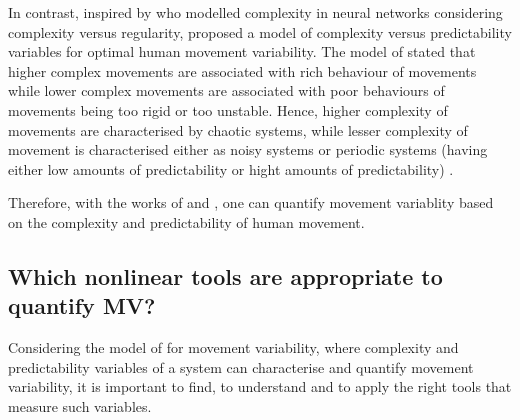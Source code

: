 In contrast, inspired by \cite{tononi1998} who modelled complexity 
in neural networks considering complexity versus regularity,
\cite{stergiou2006} proposed a model of complexity versus predictability 
variables for optimal human movement variability.
The model of \cite{stergiou2006} stated that higher complex movements are 
associated with rich behaviour of movements while lower complex movements 
are associated with poor behaviours of movements being too rigid or too 
unstable. Hence, higher complexity of movements are characterised by 
chaotic systems, while lesser complexity of movement is characterised either 
as noisy systems or periodic systems (having either low amounts of 
predictability or hight amounts of predictability) \citep{stergiou2006}.

Therefore, with the works 
of \cite{vaillancourt2002, vaillancourt2003} and \cite{stergiou2006},
one can quantify movement variablity 
based on the complexity and predictability of human movement.


\subsection{Which nonlinear tools are appropriate to quantify MV?} 
\label{which_NT_are_appropriate_to_measure_MV}


Considering the model of \cite{stergiou2006} for movement variability,
where complexity and predictability variables of a system can 
characterise and quantify movement variability, it is important to 
find, to understand and to apply the right tools that measure such variables.

